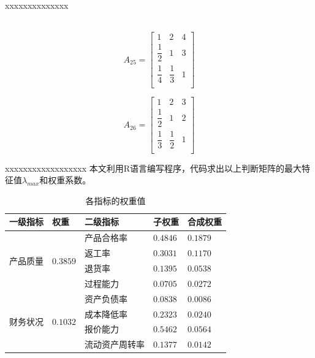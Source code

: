 \documentclass{beamer}
\begin{document}
\begin{frame}{xxxxxxxxxxxxxx}
\begin{minipage}{0.45\linewidth}
		　\scriptsize
\begin{equation}
	\label{a25}
	A_{25}=\left[ \begin{matrix}
		1&2&4\\
		\dfrac{1}{2}&1&3\\
		\dfrac{1}{4}&\dfrac{1}{3}&1\\
	\end{matrix} \right] 
\end{equation}
\end{minipage}
\begin{minipage}{0.45\linewidth}
		\scriptsize
\begin{equation}
	\label{a26}
	A_{26}=\left[ \begin{matrix}
		1&2&3\\
		\dfrac{1}{2}&1&2\\
		\dfrac{1}{3}&\dfrac{1}{2}&1\\
	\end{matrix} \right] 
\end{equation}
\end{minipage}	
\end{frame}

\begin{frame}{xxxxxxxxxxxxxxxxxx}
本文利用R语言编写程序，代码求出以上判断矩阵的最大特征值$\lambda_{max}$和权重系数。

\vspace{-2mm}
\renewcommand{\arraystretch}{1.5}	
\begin{table}[h!]   
	\centering
    \scriptsize
	\caption{各指标的权重值}   
	\label{体系2}
	\begin{tabular}{lllll}    
		\toprule    
		一级指标&权重&二级指标&子权重&合成权重\\
		\midrule   
		\multirow{4}{2cm}{产品质量}&\multirow{4}{2cm}{$0.3859$}&产品合格率&$0.4846$ &$0.1879$\\
		&&返工率& $0.3031$& $0.1170$\\
		&	&退货率 &$0.1395$& $0.0538$\\
		&&过程能力 &$0.0705$& $0.0272$\\
		\midrule   
		\multirow{4}{2cm}{财务状况}& \multirow{4}{2cm}{$0.1032$}&资产负债率& $0.0838$& $0.0086$    \\
		&	&成本降低率 &$0.2323$ & $0.0240$\\
		&&报价能力 &$0.5462$ &$0.0564$\\
		&&流动资产周转率& $0.1377$ &$0.0142$\\
		\bottomrule   
	\end{tabular}  
\end{table}
\end{frame}
\end{document}
